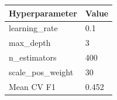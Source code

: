 \begin{tabular}{ll}
\toprule
Hyperparameter & Value \\
\midrule
learning\_rate & 0.1 \\
max\_depth & 3 \\
n\_estimators & 400 \\
scale\_pos\_weight & 30 \\
\midrule
Mean CV F1 & 0.452 \\
\bottomrule
\end{tabular}
